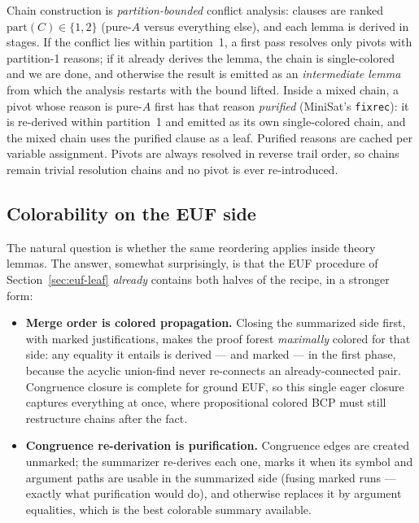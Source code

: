 \documentclass[11pt]{article}
\newcommand{\code}[1]{\texttt{#1}}
\begin{document}
Chain construction is \emph{partition-bounded} conflict analysis: clauses
are ranked $\mathrm{part}(C) \in \{1, 2\}$ (pure-$A$ versus everything
else), and each lemma is derived in stages. If the conflict lies within
partition~1, a first pass resolves only pivots with partition-1 reasons; if
it already derives the lemma, the chain is single-colored and we are done,
and otherwise the result is emitted as an \emph{intermediate lemma} from
which the analysis restarts with the bound lifted. Inside a mixed chain, a
pivot whose reason is pure-$A$ first has that reason \emph{purified}
(MiniSat's \code{fixrec}): it is re-derived within partition~1 and emitted
as its own single-colored chain, and the mixed chain uses the purified
clause as a leaf. Purified reasons are cached per variable assignment.
Pivots are always resolved in reverse trail order, so chains remain trivial
resolution chains and no pivot is ever re-introduced.

\subsection{Colorability on the EUF side}

The natural question is whether the same reordering applies inside theory
lemmas. The answer, somewhat surprisingly, is that the EUF procedure of
Section~\ref{sec:euf-leaf} \emph{already} contains both halves of the
recipe, in a stronger form:

\begin{itemize}
\item \textbf{Merge order is colored propagation.} Closing the summarized
      side first, with marked justifications, makes the proof forest
      \emph{maximally} colored for that side: any equality it entails is
      derived --- and marked --- in the first phase, because the acyclic
      union-find never re-connects an already-connected pair. Congruence
      closure is complete for ground EUF, so this single eager closure
      captures everything at once, where propositional colored BCP must
      still restructure chains after the fact.
\item \textbf{Congruence re-derivation is purification.} Congruence edges
      are created unmarked; the summarizer re-derives each one, marks it
      when its symbol and argument paths are usable in the summarized side
      (fusing marked runs --- exactly what purification would do), and
      otherwise replaces it by argument equalities, which is the best
      colorable summary available.
\end{itemize}
\end{document}

